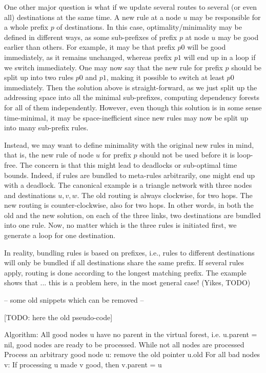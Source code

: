 One other major question is what if we update several routes to several (or even all) destinations at the same time. A new rule at a node $u$ may be responsible for a whole prefix $p$ of destinations. In this case, optimality/minimality may be defined in different ways, as some sub-prefixes of prefix $p$ at node $u$ may be good earlier than others. For example, it may be that prefix $p0$ will be good immediately, as it remains unchanged, whereas prefix $p1$ will end up in a loop if we switch immediately. One may now say that the new rule for prefix $p$ should be split up into two rules $p0$ and $p1$, making it possible to switch at least $p0$ immediately. Then the solution above is straight-forward, as we just split up the addressing space into all the minimal sub-prefixes, computing dependency forests for all of them independently. However, even though this solution is in some sense time-minimal, it may be space-inefficient since new rules may now be split up into many sub-prefix rules.

Instead, we may want to define minimality with the original new rules in mind, that is, the new rule of node $u$ for prefix $p$ should not be used before it is loop-free. The concern is that this might lead to deadlocks or sub-optimal time bounds. Indeed, if rules are bundled to meta-rules arbitrarily, one might end up with a deadlock. The canonical example is a triangle network with three nodes and destinations $u,v,w$. The old routing is always clockwise, for two hops. The new routing is counter-clockwise, also for two hops. In other words, in both the old and the new solution, on each of the three links, two destinations are bundled into one rule. Now, no matter which is the three rules is initiated first, we generate a loop for one destination.

In reality, bundling rules is based on prefixes, i.e., rules to different destinations will only be bundled if all destinations share the same prefix. If several rules apply, routing is done according to the longest matching prefix. The example shows that ... this is a problem here, in the most general case! (Yikes, TODO)




-- some old snippets which can be removed --

[TODO: here the old pseudo-code]

Algorithm:
All good nodes u have no parent in the virtual forest, i.e. u.parent = nil, good nodes are ready to be processed.
While not all nodes are processed
	Process an arbitrary good node u: remove the old pointer u.old
	For all bad nodes v:
		If processing u made v good, then v.parent = u

